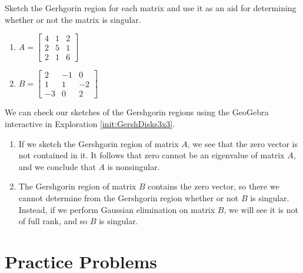 \documentclass{ximera}
\begin{document}
\begin{example}\label{ex:does_Gersh_contain_zero}
    Sketch the Gerhgorin region for each matrix and use it as an aid for determining whether or not the matrix is singular.
\begin{enumerate}
    \item $A=\left[\begin{array}{ccc}  4&1&2\\2&5&1\\2&1&6
 \end{array}\right]$
    \item $B=\left[\begin{array}{ccc}  2&-1&0\\1&1&-2\\-3&0&2
 \end{array}\right]$
\end{enumerate}

\begin{explanation}
    We can check our sketches of the Gershgorin regions using the GeoGebra interactive in Exploration \ref{init:GershDisks3x3}.
    
\begin{enumerate}
    \item If we sketch the Gershgorin region of matrix $A$, we see that the zero vector is not contained in it.  It follows that zero cannot be an eigenvalue of matrix $A$, and we conclude that $A$ is nonsingular.

    \item The Gershgorin region of matrix $B$ contains the zero vector, so there we cannot determine from the Gershgorin region whether or not $B$ is singular.  Instead, if we perform Gaussian elimination on matrix $B$, we will see it is not of full rank, and so $B$ is singular.
\end{enumerate}
\end{explanation}
\end{example}

\section{Practice Problems}
\end{document}
